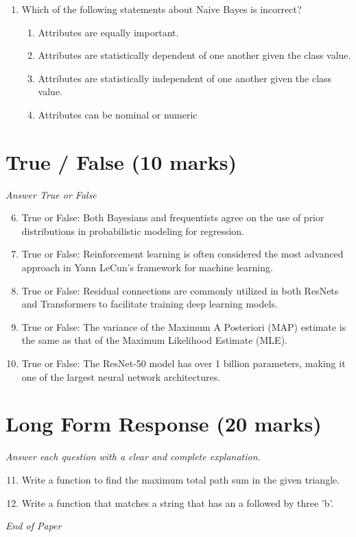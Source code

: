 \documentclass[12pt]{article}
\begin{document}
\begin{enumerate}[label=\arabic*.]
\begin{enumerate}[label=(\alph*)]
    \item 15
\end{enumerate}
\item Which of the following statements about Naive Bayes is incorrect?
\begin{enumerate}[label=(\alph*)]
    \item Attributes are equally important.
    \item Attributes are statistically dependent of one another given the class value.
    \item Attributes are statistically independent of one another given the class value.
    \item Attributes can be nominal or numeric
\end{enumerate}
\end{enumerate}

\section*{True / False (10 marks)}
\textit{Answer True or False}
\begin{enumerate}[label=\arabic*.]
\setcounter{enumi}{5}
\item True or False: Both Bayesians and frequentists agree on the use of prior distributions in probabilistic modeling for regression.
\item True or False: Reinforcement learning is often considered the most advanced approach in Yann LeCun's framework for machine learning.
\item True or False: Residual connections are commonly utilized in both ResNets and Transformers to facilitate training deep learning models.
\item True or False: The variance of the Maximum A Posteriori (MAP) estimate is the same as that of the Maximum Likelihood Estimate (MLE).
\item True or False: The ResNet-50 model has over 1 billion parameters, making it one of the largest neural network architectures.
\end{enumerate}

\section*{Long Form Response (20 marks)}
\textit{Answer each question with a clear and complete explanation.}
\begin{enumerate}[label=\arabic*.]
\setcounter{enumi}{10}
\item Write a function to find the maximum total path sum in the given triangle.
\item Write a function that matches a string that has an a followed by three 'b'.
\end{enumerate}

\vfill
\noindent\textit{End of Paper}
\end{document}
